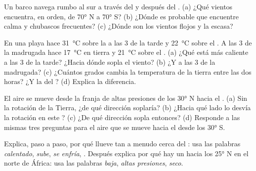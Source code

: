 \begin{exercise}[$\star\star$]\label{exo:g8:winds-global-circulation:6}
Un barco navega rumbo al sur a través del  y después del
. (a) ¿Qué vientos encuentra, en orden, de \ang{70} N a
\ang{70} S? (b) ¿Dónde es probable que encuentre calma y chubascos
frecuentes? (c) ¿Dónde son los vientos flojos y la  escasa?
\end{exercise}

\begin{exercise}[$\star\star$]\label{exo:g8:winds-global-circulation:7}
En una playa hace \qty{31}{\degreeCelsius} sobre la  a las 3 de la
tarde y \qty{22}{\degreeCelsius} sobre el . A las 3 de la madrugada hace
\qty{17}{\degreeCelsius} en tierra y \qty{21}{\degreeCelsius} sobre el .
(a) ¿Qué está más caliente a las 3 de la tarde? ¿Hacia dónde sopla el
viento? (b) ¿Y a las 3 de la madrugada? (c) ¿Cuántos grados cambia la
temperatura de la tierra entre las dos horas? ¿Y la del ? (d) Explica
la diferencia.
\end{exercise}

\begin{exercise}[$\star\star$]\label{exo:g8:winds-global-circulation:8}
El aire se mueve desde la franja de altas presiones de los \ang{30} N
hacia el . (a) Sin la rotación de la Tierra, ¿de qué dirección
soplaría? (b) ¿Hacia qué lado lo desvía la rotación en este ?
(c) ¿De qué dirección sopla entonces? (d) Responde a las mismas tres
preguntas para el aire que se mueve hacia el  desde los \ang{30} S.
\end{exercise}

\begin{exercise}[$\star\star$]\label{exo:g8:winds-global-circulation:9}
Explica, paso a paso, por qué llueve tan a menudo cerca del : usa
las palabras \emph{calentado}, \emph{sube}, \emph{se enfría}, \emph{}.
Después explica por qué hay un  hacia los \ang{25} N en el norte de
África: usa las palabras \emph{baja}, \emph{altas presiones}, \emph{seco}.
\end{exercise}

